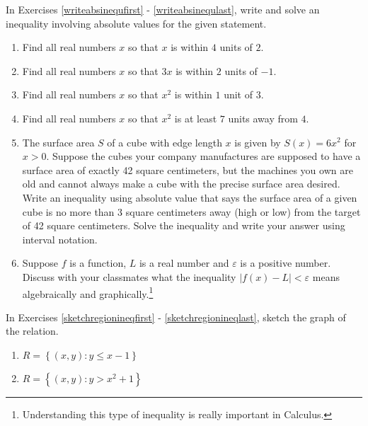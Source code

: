 In Exercises \ref{writeabsinequfirst} - \ref{writeabsinequlast}, write and solve an inequality involving absolute values for the given statement.

\begin{enumerate}
\setcounter{enumi}{\value{HW}}

\item Find all real numbers $x$ so that $x$ is within $4$ units of $2$. \label{writeabsinequfirst}

\item Find all real numbers $x$ so that $3x$ is within $2$ units of $-1$.

\item Find all real numbers $x$ so that $x^2$ is within $1$ unit of $3$.

\item Find all real numbers $x$ so that $x^2$ is at least $7$ units away from $4$. \label{writeabsinequlast}


\item The surface area $S$ of a cube with edge length $x$ is given by $S(x) = 6x^{2}$ for $x > 0$.  Suppose the cubes your company manufactures are supposed to have a surface area of exactly 42 square centimeters, but the machines you own are old and cannot always make a cube with the precise surface area desired.  Write an inequality using absolute value that says the surface area of a given cube is no more than 3 square centimeters away (high or low) from the target of 42 square centimeters.  Solve the inequality and write your answer using interval notation.

\item Suppose $f$ is a function, $L$ is a real number and $\varepsilon$ is a positive number.  Discuss with your classmates what the inequality $|f(x) - L| < \varepsilon$ means algebraically and graphically.\footnote{Understanding this type of inequality is really important in Calculus.}


\setcounter{HW}{\value{enumi}}
\end{enumerate}


In Exercises \ref{sketchregionineqfirst} - \ref{sketchregionineqlast}, sketch the graph of the relation.

\begin{multicols}{2} 
\begin{enumerate}
\setcounter{enumi}{\value{HW}}

\item $R = \left\{ (x,y) : y \leq x-1  \right\}$ \label{sketchregionineqfirst}
\item $R = \left\{ (x,y) : y > x^2 +1 \right\}$

\setcounter{HW}{\value{enumi}}
\end{enumerate}
\end{multicols}

